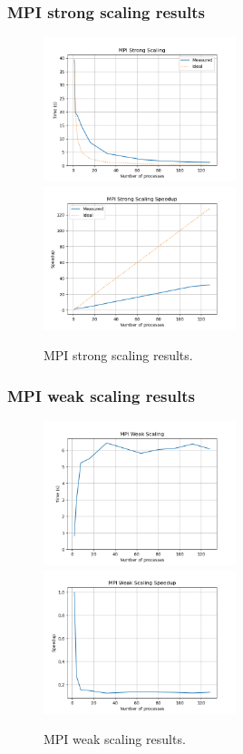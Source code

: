 \documentclass{beamer}
\begin{document}
\begin{frame}
    \frametitle{MPI \textbf{strong} scaling results}
    \begin{figure}
        \centering
        \includegraphics[width=0.5\textwidth]{../images/mpi_strong_scaling.png}
        \includegraphics[width=0.5\textwidth]{../images/mpi_strong_scaling_speedup.png}
        \caption{MPI strong scaling results.}
    \end{figure}
\end{frame}


\begin{frame}
    \frametitle{MPI \textbf{weak} scaling results}
    \begin{figure}
        \centering
        \includegraphics[width=0.5\textwidth]{../images/mpi_weak_scaling.png}
        \includegraphics[width=0.5\textwidth]{../images/mpi_weak_scaling_speedup.png}
        \caption{MPI weak scaling results.}
    \end{figure}
\end{frame}
\end{document}
